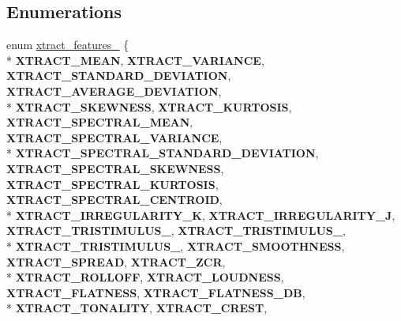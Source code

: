 \subsection*{Enumerations}
\begin{DoxyCompactItemize}
\item 
enum \hyperlink{group__libxtract_gae954afa07f7856b89accf6d8b11e2c79}{xtract\-\_\-features\-\_\-} \{ \\*
{\bfseries X\-T\-R\-A\-C\-T\-\_\-\-M\-E\-A\-N}, 
{\bfseries X\-T\-R\-A\-C\-T\-\_\-\-V\-A\-R\-I\-A\-N\-C\-E}, 
{\bfseries X\-T\-R\-A\-C\-T\-\_\-\-S\-T\-A\-N\-D\-A\-R\-D\-\_\-\-D\-E\-V\-I\-A\-T\-I\-O\-N}, 
{\bfseries X\-T\-R\-A\-C\-T\-\_\-\-A\-V\-E\-R\-A\-G\-E\-\_\-\-D\-E\-V\-I\-A\-T\-I\-O\-N}, 
\\*
{\bfseries X\-T\-R\-A\-C\-T\-\_\-\-S\-K\-E\-W\-N\-E\-S\-S}, 
{\bfseries X\-T\-R\-A\-C\-T\-\_\-\-K\-U\-R\-T\-O\-S\-I\-S}, 
{\bfseries X\-T\-R\-A\-C\-T\-\_\-\-S\-P\-E\-C\-T\-R\-A\-L\-\_\-\-M\-E\-A\-N}, 
{\bfseries X\-T\-R\-A\-C\-T\-\_\-\-S\-P\-E\-C\-T\-R\-A\-L\-\_\-\-V\-A\-R\-I\-A\-N\-C\-E}, 
\\*
{\bfseries X\-T\-R\-A\-C\-T\-\_\-\-S\-P\-E\-C\-T\-R\-A\-L\-\_\-\-S\-T\-A\-N\-D\-A\-R\-D\-\_\-\-D\-E\-V\-I\-A\-T\-I\-O\-N}, 
{\bfseries X\-T\-R\-A\-C\-T\-\_\-\-S\-P\-E\-C\-T\-R\-A\-L\-\_\-\-S\-K\-E\-W\-N\-E\-S\-S}, 
{\bfseries X\-T\-R\-A\-C\-T\-\_\-\-S\-P\-E\-C\-T\-R\-A\-L\-\_\-\-K\-U\-R\-T\-O\-S\-I\-S}, 
{\bfseries X\-T\-R\-A\-C\-T\-\_\-\-S\-P\-E\-C\-T\-R\-A\-L\-\_\-\-C\-E\-N\-T\-R\-O\-I\-D}, 
\\*
{\bfseries X\-T\-R\-A\-C\-T\-\_\-\-I\-R\-R\-E\-G\-U\-L\-A\-R\-I\-T\-Y\-\_\-\-K}, 
{\bfseries X\-T\-R\-A\-C\-T\-\_\-\-I\-R\-R\-E\-G\-U\-L\-A\-R\-I\-T\-Y\-\_\-\-J}, 
{\bfseries X\-T\-R\-A\-C\-T\-\_\-\-T\-R\-I\-S\-T\-I\-M\-U\-L\-U\-S\-\_}, 
{\bfseries X\-T\-R\-A\-C\-T\-\_\-\-T\-R\-I\-S\-T\-I\-M\-U\-L\-U\-S\-\_}, 
\\*
{\bfseries X\-T\-R\-A\-C\-T\-\_\-\-T\-R\-I\-S\-T\-I\-M\-U\-L\-U\-S\-\_}, 
{\bfseries X\-T\-R\-A\-C\-T\-\_\-\-S\-M\-O\-O\-T\-H\-N\-E\-S\-S}, 
{\bfseries X\-T\-R\-A\-C\-T\-\_\-\-S\-P\-R\-E\-A\-D}, 
{\bfseries X\-T\-R\-A\-C\-T\-\_\-\-Z\-C\-R}, 
\\*
{\bfseries X\-T\-R\-A\-C\-T\-\_\-\-R\-O\-L\-L\-O\-F\-F}, 
{\bfseries X\-T\-R\-A\-C\-T\-\_\-\-L\-O\-U\-D\-N\-E\-S\-S}, 
{\bfseries X\-T\-R\-A\-C\-T\-\_\-\-F\-L\-A\-T\-N\-E\-S\-S}, 
{\bfseries X\-T\-R\-A\-C\-T\-\_\-\-F\-L\-A\-T\-N\-E\-S\-S\-\_\-\-D\-B}, 
\\*
{\bfseries X\-T\-R\-A\-C\-T\-\_\-\-T\-O\-N\-A\-L\-I\-T\-Y}, 
{\bfseries X\-T\-R\-A\-C\-T\-\_\-\-C\-R\-E\-S\-T}, 

\end{DoxyCompactItemize}
